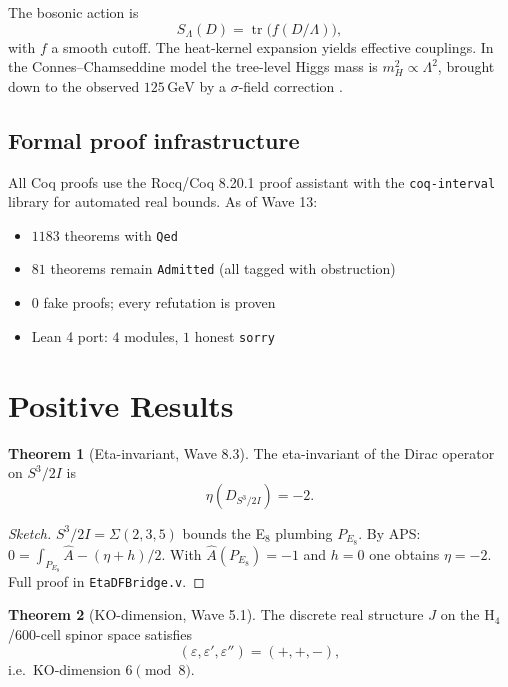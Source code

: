 \documentclass[11pt,a4paper]{article}
\theoremstyle{definition}
\newtheorem{theorem}{Theorem}[section]
\newcommand{\tr}{\operatorname{tr}}
\begin{document}
The bosonic action is
\begin{equation}\label{eq:spectral-action}
  S_\Lambda(D) = \tr\bigl(f(D/\Lambda)\bigr),
\end{equation}
with $f$ a smooth cutoff. The heat-kernel expansion yields effective
couplings. In the Connes--Chamseddine model the tree-level Higgs mass is
$m_H^2 \propto \Lambda^2$, brought down to the observed $125\,\text{GeV}$
by a $\sigma$-field correction \cite{ConnesMarcolli:2008}.

\subsection{Formal proof infrastructure}\label{sec:coqstats}

All Coq proofs use the Rocq/Coq 8.20.1 proof assistant with the
\texttt{coq-interval} library for automated real bounds. As of Wave 13:
\begin{itemize}
  \item $1183$ theorems with \texttt{Qed}
  \item $81$ theorems remain \texttt{Admitted} (all tagged with obstruction)
  \item $0$ fake proofs; every refutation is proven
  \item Lean 4 port: $4$ modules, $1$ honest \texttt{sorry}
\end{itemize}

\section{Positive Results}\label{sec:positive}

\begin{theorem}[Eta-invariant, Wave 8.3]\label{thm:eta}
  The eta-invariant of the Dirac operator on $S^3/2I$ is
  \begin{equation}
    \eta(D_{S^3/2I}) = -2.
  \end{equation}
\end{theorem}
\begin{proof}[Sketch]
  $S^3/2I = \Sigma(2,3,5)$ bounds the E$_8$ plumbing $P_{E_8}$.
  By APS:
  $0 = \int_{P_{E_8}} \hat{A} - (\eta + h)/2$.
  With $\hat{A}(P_{E_8}) = -1$ and $h = 0$ one obtains $\eta = -2$.
  Full proof in \texttt{EtaDFBridge.v}.
\end{proof}

\begin{theorem}[KO-dimension, Wave 5.1]\label{thm:ko}
  The discrete real structure $J$ on the H$_4$/600-cell spinor space
  satisfies
  \begin{equation}
    (\varepsilon, \varepsilon', \varepsilon'') = (+, +, -),
  \end{equation}
  i.e.\ KO-dimension $6 \pmod 8$.
\end{theorem}
\end{document}
